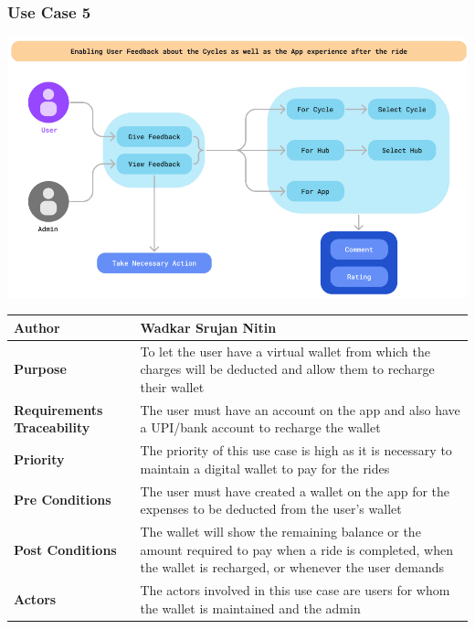\documentclass[11pt]{article}
\begin{document}
\subsubsection{Use Case 5}
\begin{center}
\includegraphics*[scale=0.5]{usecase-5.png}
\begin{tabular}{|l|p{10cm}|}
    \hline
    \textbf{Author} &  Wadkar Srujan Nitin\\
    \hline
    \textbf{Purpose} & To let the user have a virtual wallet from which the charges will be deducted and allow them to recharge their wallet \\
    \hline
    \textbf{Requirements Traceability} & The user must have an account on the app and also have a UPI/bank account to recharge the wallet\\
    \hline
    \textbf{Priority} & The priority of this use case is high as it is necessary to maintain a digital wallet to pay for the rides\\
    \hline
    \textbf{Pre Conditions} & The user must have created a wallet on the app for the expenses to be deducted from the user’s wallet\\
    \hline
    \textbf{Post Conditions} & The wallet will show the remaining balance or the amount required to pay when a ride is completed, when the wallet is recharged, or whenever the user demands\\
    \hline
    \textbf{Actors} & The actors involved in this use case are users for whom the wallet is maintained and the admin\\
    \hline
\end{tabular}
\end{center}
\end{document}
